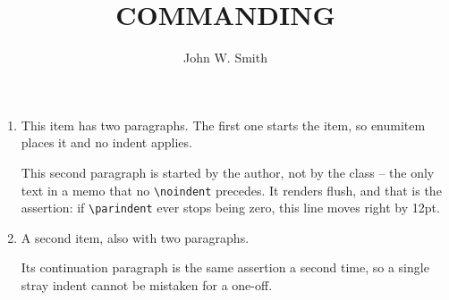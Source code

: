 \documentclass{../armymemo}
\author{John W. Smith}\rank{CPT}\branch{CY}
\title{COMMANDING}
\begin{document}
\begin{enumerate}
	\item This item has two paragraphs. The first one starts the item, so enumitem places it
	      and no indent applies.

	      This second paragraph is started by the author, not by the class -- the only text in a
	      memo that no \verb!\noindent! precedes. It renders flush, and that is the assertion:
	      if \verb!\parindent! ever stops being zero, this line moves right by 12pt.
	\item A second item, also with two paragraphs.

	      Its continuation paragraph is the same assertion a second time, so a single stray
	      indent cannot be mistaken for a one-off.
\end{enumerate}
\end{document}
